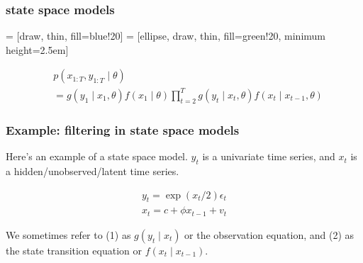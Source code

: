 \documentclass{beamer}
\begin{document}
\begin{frame}[fragile]
\frametitle{state space models}

 = [draw, thin, fill=blue!20]
 = [ellipse, draw, thin, fill=green!20, minimum height=2.5em]

\begin{figure}
\end{figure}


\begin{align*}
&p(x_{1:T}, y_{1:T} \mid \theta) \\
&= g(y_1 \mid x_1, \theta) f(x_1 \mid \theta) \prod_{t=2}^T g(y_t \mid x_t, \theta) f(x_t \mid x_{t-1}, \theta)
\end{align*}

\end{frame}
\begin{frame}[fragile]
\frametitle{Example: filtering in state space models}

Here's an example of a state space model. $y_t$ is a univariate time series, and $x_t$ is a hidden/unobserved/latent time series.
\newline

\begin{gather}
y_t = \exp(x_t / 2) \epsilon_t \\
x_t = c + \phi x_{t-1} + v_t
\end{gather}

We sometimes refer to (1) as $g(y_t \mid x_t)$ or the observation equation, and (2) as the state transition equation or $f(x_t \mid x_{t-1})$.
\end{frame}
\end{document}
